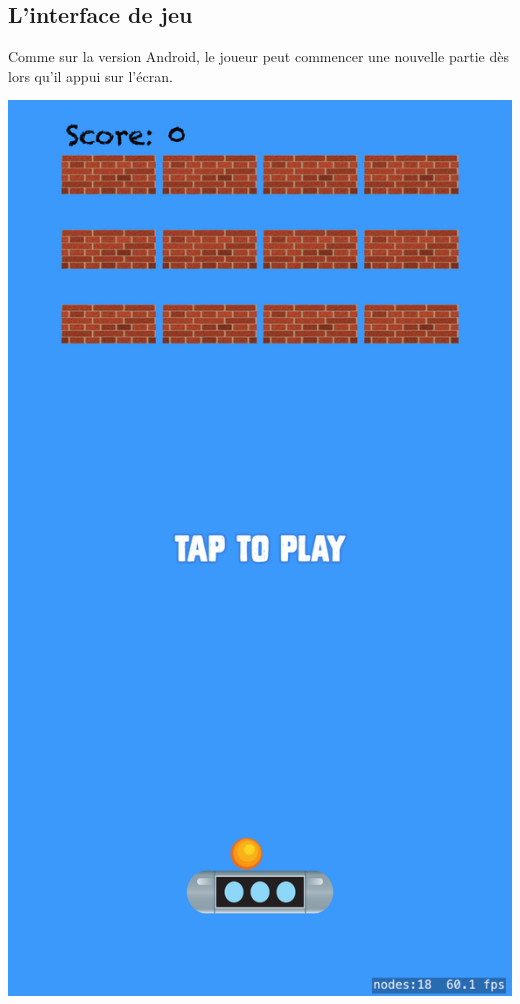 \documentclass[a4paper]{article}
\begin{document}
\subsection{L'interface de jeu}
Comme sur la version Android, le joueur peut commencer une nouvelle partie dès lors qu'il appui sur l'écran.
\begin{center}
  \includegraphics[scale=0.11]{images/iOS1.png}
\end{center}
\end{document}
